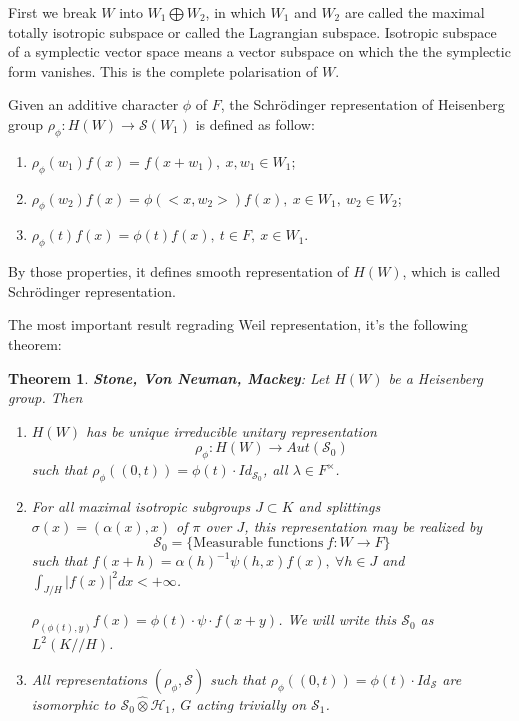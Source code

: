 \documentclass[12pt,a4paper,english]{article}
\theoremstyle{plain}
\newtheorem{thm}{Theorem}[section]
\theoremstyle{definition}
\begin{document}
First we break $W$ into $W_{1}\bigoplus W_{2}$, in which $W_{1}$ and $W_{2}$ are called the maximal totally isotropic subspace or called the Lagrangian subspace. Isotropic subspace of a symplectic vector space means a vector subspace on which the the symplectic form vanishes.  This is the complete polarisation of $W$.

Given an additive character $\phi$ of $F$, the Schr\"odinger representation of Heisenberg group $\rho_{\phi}: H(W)\rightarrow \mathcal{S}(W_{1})$ is defined as follow: 
\begin{enumerate}
    \item $\rho_{\phi}(w_{1})f(x)=f(x+w_{1}),\ x,w_{1}\in W_{1}$;
    \item $\rho_{\phi}(w_{2})f(x)=\phi(<x,w_{2}>)f(x),\ x\in W_{1},\ w_{2}\in W_{2}$;
    \item $\rho_{\phi}(t)f(x)=\phi(t)f(x),\ t\in F,\ x\in W_{1}$.
\end{enumerate}
By those properties, it defines smooth representation of $H(W)$, which is called Schr\"odinger representation.

The most important result regrading Weil representation, it's the following theorem:
\begin{thm}
\textbf{Stone, Von Neuman, Mackey}: Let $H(W)$ be a Heisenberg group. Then
\begin{enumerate}
    \item $H(W)$ has be unique irreducible unitary representation
    \begin{equation*}
        \rho_{\phi}: H(W)\rightarrow Aut(\mathcal{S}_{0})
    \end{equation*}
    such that $\rho_{\phi}((0, t))=\phi(t)\cdot Id_{\mathcal{S}_{0}}$, all $\lambda\in F^{\times}$.
    \item For all maximal isotropic subgroups $J\subset K$ and splittings $\sigma(x)=(\alpha(x),x)$ of $\pi$ over $J$, this representation may be realized by 
    \begin{equation*}
        \mathcal{S}_{0}=\{\text{Measurable functions}\ f: W\rightarrow F \}
    \end{equation*}
    such that $f(x+h)=\alpha(h)^{-1}\psi(h,x)f(x),\ \forall h\in J$ and $\int_{J/H}|f(x)|^{2}dx<+\infty$.
    
    $\rho_{(\phi(t),y)}f(x)=\phi(t)\cdot\psi\cdot f(x+y)$. We will write this $\mathcal{S}_{0}$ as $L^{2}(K//H)$.
    \item All representations $(\rho_{\phi},\mathcal{S})$ such that $\rho_{\phi}((0,t))=\phi(t)\cdot Id_{\mathcal{S}}$ are isomorphic to $\mathcal{S}_{0}\hat{\otimes}\mathcal{H}_{1}$, $G$ acting trivially on $\mathcal{S}_{1}$.
\end{enumerate}
\end{thm}
\end{document}
